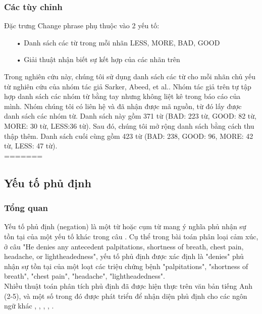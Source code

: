 \subsubsection*{Các tùy chỉnh}
Đặc trưng Change phrase phụ thuộc vào 2 yếu tố:
\begin{itemize}[noitemsep]
\item[•] Danh sách các từ trong mỗi nhãn LESS, MORE, BAD, GOOD
\item[•] Giải thuật nhận biết sự kết hợp của các nhãn trên
\end{itemize}
Trong nghiên cứu này, chúng tôi sử dụng danh sách các từ cho mỗi nhãn chủ yếu từ nghiên cứu của nhóm tác giả Sarker, Abeed, et al.\cite{sarker2011outcome}. Nhóm tác giả trên tự tập hợp danh sách các nhóm từ bằng tay nhưng không liệt kê trong báo cáo của mình. Nhóm chúng tôi có liên hệ và đã nhận được mã nguồn, từ đó lấy được danh sách các nhóm từ. Danh sách này gồm 371 từ (BAD: 223 từ, GOOD: 82 từ, MORE: 30 từ, LESS:36 từ). Sau đó, chúng tôi mở rộng danh sách bằng cách thu thập thêm. Danh sách cuối cùng gồm 423 từ (BAD: 238, GOOD: 96, MORE: 42 từ, LESS: 47 từ).\\
=======
\subsection{Yếu tố phủ định}
\subsubsection*{Tổng quan}
Yếu tố phủ định (negation) là một từ hoặc cụm từ mang ý nghĩa phủ nhận sự tồn tại của một yếu tố khác trong câu \cite{skeppstedt2016marker}. Cụ thể trong bài toán phân loại cảm xúc, ở câu "He denies any antecedent palpitations, shortness of breath, chest pain, headache, or lightheadedness", yếu tố phủ định được xác định là "denies" phủ nhận sự tồn tại của một loạt các triệu chứng bệnh "palpitations", "shortness of breath", "chest pain", "headache", "lightheadedness".  \\

Nhiều thuật toán phân tích phủ định đã được hiện thực trên văn bản tiếng Anh (2-5)\cite{Chapman2013}, \cite{Zeng2007} và một số trong đó được phát triển để nhận diện phủ định cho các ngôn ngữ khác \cite{costumero2014an}, \cite{benamara2012how}, \cite{gindl2006negation}, \cite{Chapman2013}, \cite{CruzDiaz2015}. \\


